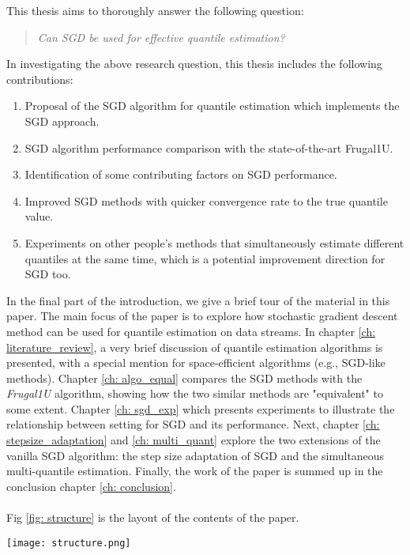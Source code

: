 This thesis aims to thoroughly answer the following question:
\begin{quote}
\emph{Can SGD be used for effective quantile estimation?}
\end{quote}

In investigating the above research question, this thesis includes the following contributions:
\begin{enumerate}
    \item Proposal of the SGD algorithm for quantile estimation which implements the SGD approach.
    \item SGD algorithm performance comparison with the state-of-the-art Frugal1U.
    \item Identification of some contributing factors on SGD performance.
    \item Improved SGD methods with quicker convergence rate to the true quantile value.
    \item Experiments on other people's methods that simultaneously estimate different quantiles at the same time, which is a potential improvement direction for SGD too.
\end{enumerate}

In the final part of the introduction, we give a brief tour of the material in this paper. The main focus of the paper is to explore how stochastic gradient descent method can be used for quantile estimation on data streams.
In chapter \ref{ch: literature_review}, a very brief discussion of quantile estimation algorithms is presented, with a special mention for space-efficient algorithms (e.g., SGD-like methods). 
Chapter \ref{ch: algo_equal} compares the SGD methods with the \textit{Frugal1U} algorithm\cite{maFrugalStreamingEstimating2014}, showing how the two similar methods are "equivalent" to some extent.
Chapter \ref{ch: sgd_exp} which presents experiments to illustrate the relationship between setting for SGD and its performance.
Next, chapter \ref{ch: stepsize_adaptation} and \ref{ch: multi_quant} explore the two extensions of the vanilla SGD algorithm: the step size adaptation of SGD and the simultaneous multi-quantile estimation. Finally, the work of the paper is summed up in the conclusion chapter \ref{ch: conclusion}.
\\\\
Fig \ref{fig: structure} is the layout of the contents of the paper.

\begin{figure*}[h!]
    \centering
	\texttt{[image: structure.png]}
    \caption{The relationship between topics covered in the thesis. Topics are roughly positioned along the top-bottom axis depending on where they are more close to SGD methods (left) or non-SGD methods (right). The arrows between the chapters represent are connected according to dependence.}
    \label{fig: structure}
\end{figure*}

